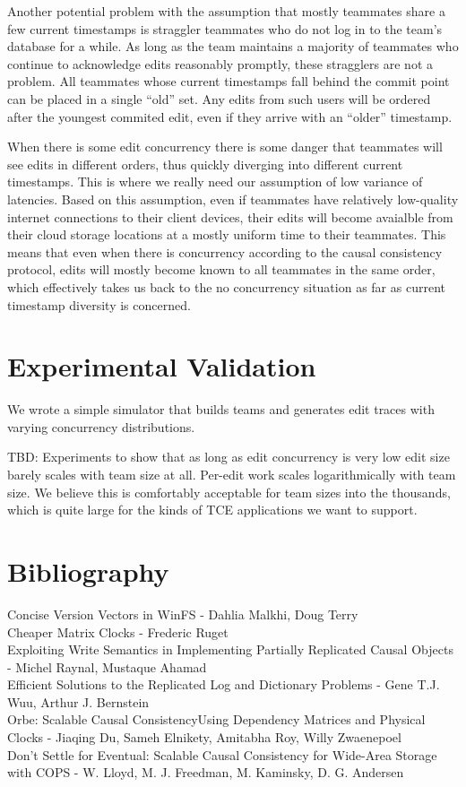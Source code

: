 \documentclass[runningheads]{llncs}
\begin{document}
Another potential problem with the assumption that mostly teammates share a few current timestamps is straggler teammates who do not log in to the team's database for a while.
As long as the team maintains a majority of teammates who continue to acknowledge edits reasonably promptly, these stragglers are not a problem.
All teammates whose current timestamps fall behind the commit point can be placed in a single ``old'' set.
Any edits from such users will be ordered after the youngest commited edit, even if they arrive with an ``older'' timestamp.

When there is some edit concurrency there is some danger that teammates will see edits in different orders, thus quickly diverging into different current timestamps.
This is where we really need our assumption of low variance of latencies.
Based on this assumption, even if teammates have relatively low-quality internet connections to their client devices, their edits will become avaialble from their cloud storage locations at a mostly uniform time to their teammates.
This means that even when there is concurrency according to the causal consistency protocol, edits will mostly become known to all teammates in the same order, which effectively takes us back to the no concurrency situation as far as current timestamp diversity is concerned.

\section{Experimental Validation}

We wrote a simple simulator that builds teams and generates edit traces with varying concurrency distributions.

TBD: Experiments to show that as long as edit concurrency is very low edit size barely scales with team size at all.
Per-edit work scales logarithmically with team size.
We believe this is comfortably acceptable for team sizes into the thousands, which is quite large for the kinds of TCE applications we want to support.

\section{Bibliography}


Concise Version Vectors in WinFS - Dahlia Malkhi, Doug Terry \\
Cheaper Matrix Clocks - Frederic Ruget \\
Exploiting Write Semantics in Implementing Partially Replicated Causal Objects - Michel Raynal, Mustaque Ahamad \\
Efficient Solutions to the Replicated Log and Dictionary Problems - Gene T.J. Wuu, Arthur J. Bernstein \\
Orbe: Scalable Causal ConsistencyUsing Dependency Matrices and Physical Clocks - Jiaqing Du, Sameh Elnikety, Amitabha Roy, Willy Zwaenepoel \\
Don't Settle for Eventual: Scalable Causal Consistency for Wide-Area Storage with COPS - W. Lloyd, M. J. Freedman, M. Kaminsky, D. G. Andersen
\end{document}
